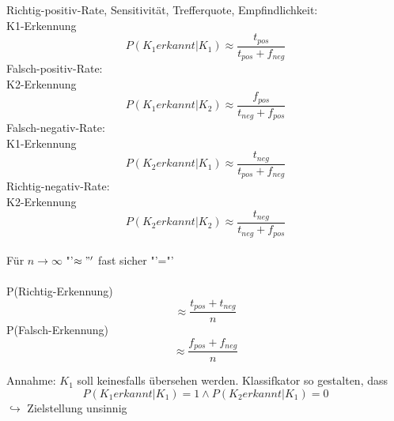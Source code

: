 \documentclass[a4paper,12pt]{scrreprt}
\begin{document}
\begin{enumerate}[a)]
Richtig-positiv-Rate, Sensitivität, Trefferquote, Empfindlichkeit:\\
\quad K1-Erkennung\\
$$P(K_1 erkannt | K_1)\approx \frac{t_{pos}}{t_{pos}+f_{neg}  } $$
Falsch-positiv-Rate:\\
 \quad K2-Erkennung \\
$$P(K_1 erkannt | K_2)\approx \frac{f_{pos}}{t_{neg}+f_{pos}}  $$
Falsch-negativ-Rate:\\
\quad K1-Erkennung\\
$$P(K_2 erkannt | K_1)\approx \frac{t_{neg}}{t_{pos}+f_{neg} }  $$
Richtig-negativ-Rate:\\
\quad K2-Erkennung\\ 
$$P(K_2 erkannt | K_2)\approx \frac{t_{neg}}{t_{neg}+f_{pos} }  $$
\\
Für $n \to \infty$ "'$\approx"'$ fast sicher "'="'\\
\\
P(Richtig-Erkennung) $$\approx \frac{t_{pos}+t_{neg}}{n}$$
P(Falsch-Erkennung) $$ \approx \frac{f_{pos}+f_{neg}}{n} $$

Annahme: $K_1$ soll keinesfalls übersehen werden. Klassifkator so gestalten, dass
$$ P(K_1 erkannt | K_1) = 1 \land P(K_2 erkannt | K_1) =0  $$
$\hookrightarrow$ Zielstellung unsinnig
\end{enumerate}
\end{document}
